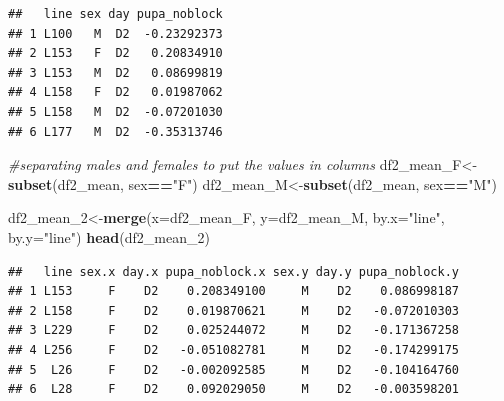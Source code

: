 \documentclass[
]{article}
\newenvironment{Shaded}{\begin{snugshade}}{\end{snugshade}}
\newcommand{\CommentTok}[1]{\textcolor[rgb]{0.56,0.35,0.01}{\textit{#1}}}
\newcommand{\DataTypeTok}[1]{\textcolor[rgb]{0.13,0.29,0.53}{#1}}
\newcommand{\DecValTok}[1]{\textcolor[rgb]{0.00,0.00,0.81}{#1}}
\newcommand{\KeywordTok}[1]{\textcolor[rgb]{0.13,0.29,0.53}{\textbf{#1}}}
\newcommand{\NormalTok}[1]{#1}
\newcommand{\OperatorTok}[1]{\textcolor[rgb]{0.81,0.36,0.00}{\textbf{#1}}}
\newcommand{\StringTok}[1]{\textcolor[rgb]{0.31,0.60,0.02}{#1}}
\begin{document}
\begin{verbatim}
##   line sex day pupa_noblock
## 1 L100   M  D2  -0.23292373
## 2 L153   F  D2   0.20834910
## 3 L153   M  D2   0.08699819
## 4 L158   F  D2   0.01987062
## 5 L158   M  D2  -0.07201030
## 6 L177   M  D2  -0.35313746
\end{verbatim}

\begin{Shaded}
\begin{Highlighting}[]
\CommentTok{#separating males and females to put the values in columns}
\NormalTok{df2_mean_F<-}\KeywordTok{subset}\NormalTok{(df2_mean, sex}\OperatorTok{==}\StringTok{"F"}\NormalTok{)}
\NormalTok{df2_mean_M<-}\KeywordTok{subset}\NormalTok{(df2_mean, sex}\OperatorTok{==}\StringTok{"M"}\NormalTok{)}

\NormalTok{df2_mean_}\DecValTok{2}\NormalTok{<-}\KeywordTok{merge}\NormalTok{(}\DataTypeTok{x=}\NormalTok{df2_mean_F, }\DataTypeTok{y=}\NormalTok{df2_mean_M, }\DataTypeTok{by.x=}\StringTok{"line"}\NormalTok{, }\DataTypeTok{by.y=}\StringTok{"line"}\NormalTok{)}
\KeywordTok{head}\NormalTok{(df2_mean_}\DecValTok{2}\NormalTok{)}
\end{Highlighting}
\end{Shaded}

\begin{verbatim}
##   line sex.x day.x pupa_noblock.x sex.y day.y pupa_noblock.y
## 1 L153     F    D2    0.208349100     M    D2    0.086998187
## 2 L158     F    D2    0.019870621     M    D2   -0.072010303
## 3 L229     F    D2    0.025244072     M    D2   -0.171367258
## 4 L256     F    D2   -0.051082781     M    D2   -0.174299175
## 5  L26     F    D2   -0.002092585     M    D2   -0.104164760
## 6  L28     F    D2    0.092029050     M    D2   -0.003598201
\end{verbatim}

\begin{Shaded}
\end{Shaded}
\end{document}
